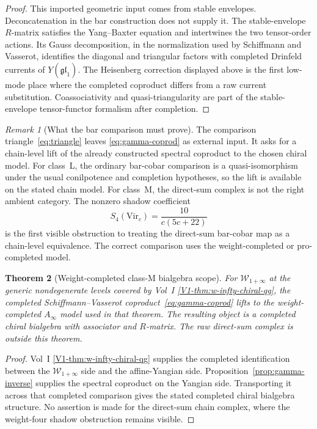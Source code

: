 \documentclass[11pt]{article}
\newtheorem{theorem}{Theorem}[section]
\theoremstyle{remark}
\newtheorem{remark}[theorem]{Remark}
\providecommand{\fgl}{\mathfrak{gl}}
\providecommand{\Ainf}{A_\infty}
\begin{document}
\begin{proof}
This imported geometric input comes from stable envelopes.
Deconcatenation in the bar construction does not supply it.  The stable-envelope
$R$-matrix satisfies the Yang--Baxter equation and intertwines the
two tensor-order actions.  Its Gauss decomposition, in the
normalization used by Schiffmann and Vasserot, identifies the diagonal
and triangular factors with completed Drinfeld currents of
$Y(\widehat{\fgl}_1)$.  The Heisenberg correction displayed above is
the first low-mode place where the completed coproduct differs from a
raw current substitution.  Coassociativity and quasi-triangularity are
part of the stable-envelope tensor-functor formalism after completion.
\end{proof}

\begin{remark}[What the bar comparison must prove]
\label{rem:class-M-obstruction}
The comparison triangle~\eqref{eq:triangle} leaves
\eqref{eq:gamma-coprod} as external input.  It asks for a chain-level lift of the
already constructed spectral coproduct to the chosen chiral model.
For class~L, the ordinary bar-cobar comparison is a quasi-isomorphism
under the usual conilpotence and completion hypotheses, so the lift is
available on the stated chain model.  For class~M, the direct-sum
complex is not the right ambient category.  The nonzero shadow
coefficient
\[
S_4(\mathrm{Vir}_c)=\frac{10}{c(5c+22)}
\]
is the first visible obstruction to treating the direct-sum
bar-cobar map as a chain-level equivalence.  The correct comparison
uses the weight-completed or pro-completed model.
\end{remark}

\begin{theorem}[Weight-completed class-M bialgebra scope]
\label{thm:chain-level-coprod-weight-completed}%
For $\mathcal{W}_{1+\infty}$ at the generic nondegenerate levels
covered by Vol~I \ref*{V1-thm:w-infty-chiral-qg}, the completed
Schiffmann--Vasserot coproduct~\eqref{eq:gamma-coprod} lifts to the
weight-completed $\Ainf$ model used in that theorem.  The resulting
object is a completed chiral bialgebra with associator and
$R$-matrix.  The raw direct-sum complex is outside this theorem.
\end{theorem}

\begin{proof}
Vol~I \ref*{V1-thm:w-infty-chiral-qg} supplies the completed
identification between the $\mathcal W_{1+\infty}$ side and the
affine-Yangian side.  Proposition~\ref{prop:gamma-inverse} supplies
the spectral coproduct on the Yangian side.  Transporting it across
that completed comparison gives the stated completed chiral bialgebra
structure.  No assertion is made for the direct-sum chain complex,
where the weight-four shadow obstruction remains visible.
\end{proof}
\end{document}

